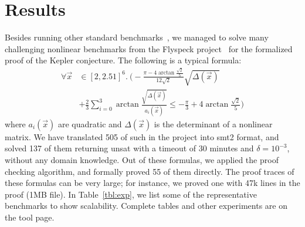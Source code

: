 \documentclass[envcountsect]{llncs}
\begin{document}
\section{Results}

Besides running other standard benchmarks~\cite{DBLP:conf/cade/JovanovicM12},
we managed to solve many challenging nonlinear benchmarks from the Flyspeck
project~\cite{DBLP:conf/dagstuhl/Hales05} for the
formalized proof of the Kepler
conjecture. The following is a typical formula:
\begin{align*}
\forall \vec x&\in [2, 2.51]^6.\ \Big( -\frac{\pi-4\arctan\frac{\sqrt
2}{5}}{12\sqrt2}\sqrt{\Delta(\vec x)}\\
&+\frac{2}{3}\sum_{i=0}^3\arctan\frac{\sqrt{\Delta(\vec x)}}{a_i(\vec x)}\leq
-\frac{\pi}{3}+4\arctan\frac{\sqrt 2}{5}\Big)
\end{align*}
where $a_i(\vec x)$ are quadratic and $\Delta(\vec x)$ is the
determinant of a nonlinear matrix. We have translated 505 of such in the
project into smt2 format, and solved 137 of them returning {\sf unsat} with a
timeout of 30 minutes and $\delta=10^{-3}$, without any domain knowledge. Out of
these formulas, we applied the proof checking algorithm, and formally proved 55
of them directly. The proof traces of these formulas can be very large; for
instance, we proved one with 47k lines in the proof (1MB file). In
Table~\ref{tbl:exp}, we list some of the representative benchmarks to show
scalability. Complete tables and other experiments are on the tool page. 




\end{document}
